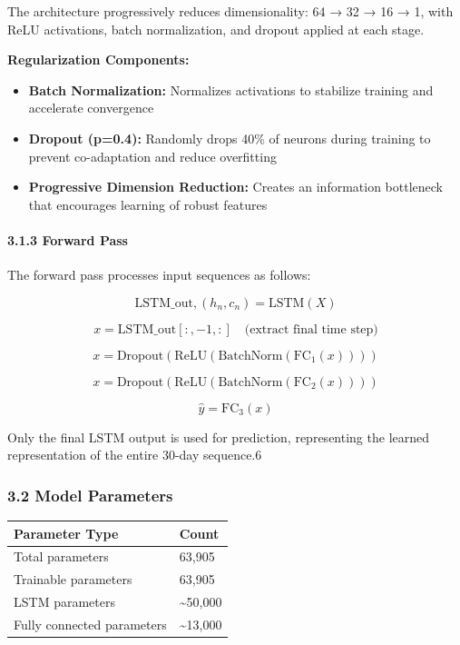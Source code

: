 \documentclass[
]{article}
\newcounter{none} %
\begin{document}
The architecture progressively reduces dimensionality: 64 → 32 → 16 → 1,
with ReLU activations, batch normalization, and dropout applied at each
stage.

\textbf{Regularization Components:}

\begin{itemize}
\item
  \textbf{Batch Normalization:} Normalizes activations to stabilize
  training and accelerate convergence
\item
  \textbf{Dropout (p=0.4):} Randomly drops 40\% of neurons during
  training to prevent co-adaptation and reduce overfitting
\item
  \textbf{Progressive Dimension Reduction:} Creates an information
  bottleneck that encourages learning of robust features
\end{itemize}

\paragraph{3.1.3 Forward Pass}\label{313-forward-pass}

The forward pass processes input sequences as follows:

\[\text{LSTM\_out}, (h_n, c_n) = \text{LSTM}(X)\]

\[x = \text{LSTM\_out}[:, -1, :] \quad \text{(extract final time step)}\]

\[x = \text{Dropout}(\text{ReLU}(\text{BatchNorm}(\text{FC}_1(x))))\]

\[x = \text{Dropout}(\text{ReLU}(\text{BatchNorm}(\text{FC}_2(x))))\]

\[\hat{y} = \text{FC}_3(x)\]

Only the final LSTM output is used for prediction, representing the
learned representation of the entire 30-day sequence.6

\subsubsection{3.2 Model Parameters}\label{32-model-parameters}

{\def\LTcaptype{none} %
\begin{longtable}[]{@{}ll@{}}
\toprule\noalign{}
Parameter Type & Count \\
\midrule\noalign{}
\endhead
\bottomrule\noalign{}
\endlastfoot
Total parameters & 63,905 \\
Trainable parameters & 63,905 \\
LSTM parameters & \textasciitilde50,000 \\
Fully connected parameters & \textasciitilde13,000 \\
\end{longtable}
}
\end{document}
